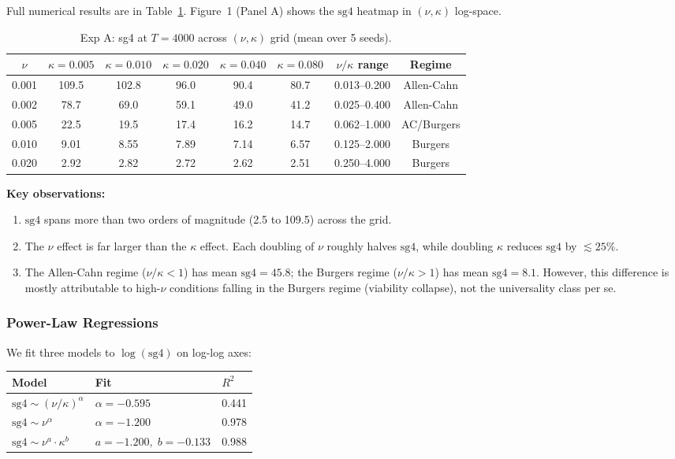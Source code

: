 \documentclass[11pt]{article}
\begin{document}
Full numerical results are in Table~\ref{tab:expA}. Figure~1 (Panel A) shows the
$\mathrm{sg4}$ heatmap in $(\nu, \kappa)$ log-space.

\begin{table}[h]
\centering
\small
\caption{Exp A: sg4 at $T=4000$ across $(\nu, \kappa)$ grid (mean over 5 seeds).}
\label{tab:expA}
\begin{tabular}{cccccccc}
\toprule
$\nu$ & $\kappa=0.005$ & $\kappa=0.010$ & $\kappa=0.020$ & $\kappa=0.040$ & $\kappa=0.080$ & $\nu/\kappa$ range & Regime \\
\midrule
0.001 & 109.5 & 102.8 & 96.0 & 90.4 & 80.7 & 0.013--0.200 & Allen-Cahn \\
0.002 & 78.7  & 69.0  & 59.1 & 49.0 & 41.2 & 0.025--0.400 & Allen-Cahn \\
0.005 & 22.5  & 19.5  & 17.4 & 16.2 & 14.7 & 0.062--1.000 & AC/Burgers \\
0.010 & 9.01  & 8.55  & 7.89 & 7.14 & 6.57 & 0.125--2.000 & Burgers \\
0.020 & 2.92  & 2.82  & 2.72 & 2.62 & 2.51 & 0.250--4.000 & Burgers \\
\bottomrule
\end{tabular}
\end{table}

\textbf{Key observations:}
\begin{enumerate}
\item $\mathrm{sg4}$ spans more than two orders of magnitude (2.5 to 109.5) across the grid.
\item The $\nu$ effect is far larger than the $\kappa$ effect. Each doubling of $\nu$ roughly
  halves $\mathrm{sg4}$, while doubling $\kappa$ reduces $\mathrm{sg4}$ by $\lesssim 25\%$.
\item The Allen-Cahn regime ($\nu/\kappa < 1$) has mean $\mathrm{sg4} = 45.8$;
  the Burgers regime ($\nu/\kappa > 1$) has mean $\mathrm{sg4} = 8.1$.
  However, this difference is mostly attributable to high-$\nu$ conditions falling in the
  Burgers regime (viability collapse), not the universality class per se.
\end{enumerate}

\subsubsection*{Power-Law Regressions}

We fit three models to $\log(\mathrm{sg4})$ on log-log axes:

\begin{center}
\begin{tabular}{lll}
\toprule
Model & Fit & $R^2$ \\
\midrule
$\mathrm{sg4} \sim (\nu/\kappa)^{\alpha}$ & $\alpha = -0.595$ & 0.441 \\
$\mathrm{sg4} \sim \nu^{\alpha}$ & $\alpha = -1.200$ & 0.978 \\
$\mathrm{sg4} \sim \nu^{a} \cdot \kappa^{b}$ & $a = -1.200,\; b = -0.133$ & 0.988 \\
\bottomrule
\end{tabular}
\end{center}
\end{document}
